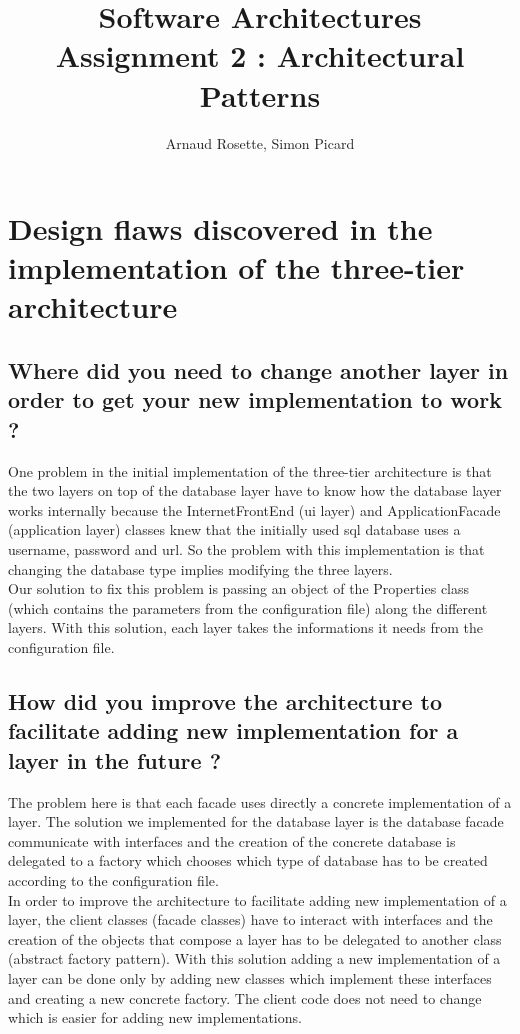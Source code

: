 \documentclass[a4paper,10pt]{article}
\title{Software Architectures\\ Assignment 2 : Architectural Patterns}
\author{Arnaud Rosette, Simon Picard}
\begin{document}
\maketitle

\section{Design flaws discovered in the implementation of the three-tier architecture}
\subsection{Where did you need to change another layer in order to get your new implementation to work ?}
One problem in the initial implementation of the three-tier architecture is that the two layers on top of the database layer have to know how the database layer works internally because the InternetFrontEnd (ui layer) and ApplicationFacade (application layer) classes knew that the initially used sql database uses a username, password and url. So the problem with this implementation is that changing the database type implies modifying the three layers. \\
Our solution to fix this problem is passing an object of the Properties class (which contains the parameters from the configuration file) along the different layers. With this solution, each layer takes the informations it needs from the configuration file. 
\subsection{How did you improve the architecture to facilitate adding new implementation for a layer in the future ?}
The problem here is that each facade uses directly a concrete implementation of a layer. The solution we implemented for the database layer is the database facade communicate with interfaces and the creation of the concrete database is delegated to a factory which chooses which type of database has to be created according to the configuration file.\\
In order to improve the architecture to facilitate adding new implementation of a layer, the client classes (facade classes) have to interact with interfaces and the creation of the objects that compose a layer has to be delegated to another class (abstract factory pattern). With this solution adding a new implementation of a layer can be done only by adding new classes which implement these interfaces and creating a new concrete factory. The client code does not need to change which is easier for adding new implementations.
\end{document}
